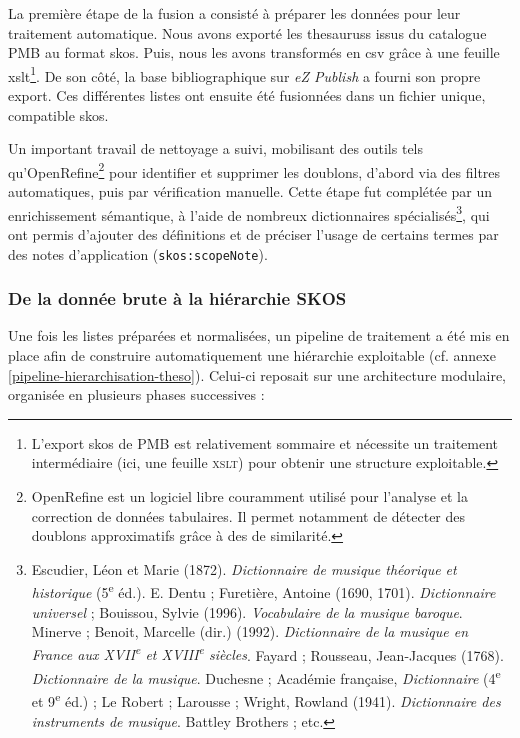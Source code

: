 La première étape de la fusion a consisté à préparer les données pour leur traitement automatique. Nous avons exporté les \glspl{thesaurus} issus du catalogue PMB au format \gls{skos}. Puis, nous les avons transformés en \gls{csv} grâce à une feuille \gls{xslt}\footnote{L’export \gls{skos} de PMB est relativement sommaire et nécessite un traitement intermédiaire (ici, une feuille \textsc{\gls{xslt}}) pour obtenir une structure exploitable.}. De son côté, la base bibliographique sur \textit{eZ Publish} a fourni son propre export. Ces différentes listes ont ensuite été fusionnées dans un fichier unique, compatible \gls{skos}.

Un important travail de nettoyage a suivi, mobilisant des outils tels qu’OpenRefine\footnote{OpenRefine est un logiciel libre couramment utilisé pour l’analyse et la correction de données tabulaires. Il permet notamment de détecter des doublons approximatifs grâce à des  de similarité.} pour identifier et supprimer les doublons, d’abord via des filtres automatiques, puis par vérification manuelle. Cette étape fut complétée par un enrichissement sémantique, à l’aide de nombreux dictionnaires spécialisés\footnote{Escudier, Léon et Marie (1872). \textit{Dictionnaire de musique théorique et historique} (5\textsuperscript{e} éd.). E. Dentu ; Furetière, Antoine (1690, 1701). \textit{Dictionnaire universel} ; Bouissou, Sylvie (1996). \textit{Vocabulaire de la musique baroque}. Minerve ; Benoit, Marcelle (dir.) (1992). \textit{Dictionnaire de la musique en France aux XVII\textsuperscript{e} et XVIII\textsuperscript{e} siècles}. Fayard ; Rousseau, Jean-Jacques (1768). \textit{Dictionnaire de la musique}. Duchesne ; Académie française, \textit{Dictionnaire} (4\textsuperscript{e} et 9\textsuperscript{e} éd.) ; Le Robert ; Larousse ; Wright, Rowland (1941). \textit{Dictionnaire des instruments de musique}. Battley Brothers ; etc.}, qui ont permis d’ajouter des définitions et de préciser l’usage de certains termes par des notes d’application (\texttt{skos:scopeNote}).

\subsubsection{De la donnée brute à la hiérarchie SKOS}

Une fois les listes préparées et normalisées, un pipeline de traitement a été mis en place afin de construire automatiquement une hiérarchie exploitable (cf. annexe \ref{pipeline-hierarchisation-theso}). Celui-ci reposait sur une architecture modulaire, organisée en plusieurs phases successives :

